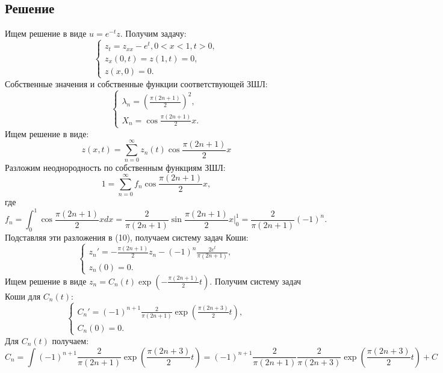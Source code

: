 \documentclass[11pt]{article}
\begin{document}
\subsection{Решение}
\label{sec:orgbe3dfe1}
Ищем решение в виде $u = e^{-t}z$. Получим задачу:
\begin{equation}
\begin{cases}
z_t = z_{xx} - e^t, 0 < x < 1, t > 0, \\
z_x(0, t) = z(1, t) = 0, \\
z(x, 0) = 0.
\end{cases}
\end{equation}
Собственные значения и собственные функции соответствующей ЗШЛ:
\begin{equation*}
\begin{cases}
\lambda_n = \left(\frac{\pi(2n + 1)}2\right)^2, \\
X_n = \cos\frac{\pi(2n + 1)}2x.
\end{cases}
\end{equation*}
Ищем решение в виде:
\begin{equation}
z(x, t) = \sum_{n = 0}^{\infty}z_n(t)\cos\frac{\pi(2n + 1)}2x
\end{equation}
Разложим неоднородность по собственным функциям ЗШЛ:
\begin{equation*}
1 = \sum_{n = 0}^{\infty}f_n\cos\frac{\pi(2n + 1)}2x,
\end{equation*}
где
\begin{equation*}
f_n = \int_0^1\cos\frac{\pi(2n + 1)}2xdx = \frac2{\pi(2n + 1)}\sin\frac{\pi(2n + 1)}2x|_0^1 = 
\frac2{\pi(2n + 1)}(-1)^n.
\end{equation*}
Подставляя эти разложения в (10), получаем систему задач Коши:
\begin{equation}
\begin{cases}
z_n' = -\frac{\pi(2n + 1)}2z_n - (-1)^n\frac{2e^t}{\pi(2n + 1)}, \\
z_n(0) = 0.
\end{cases}
\end{equation}
Ищем решение в виде $z_n = C_n(t)\exp\left(-\frac{\pi(2n + 1)}2t\right)$. Получим систему задач
Коши для $C_n(t)$:
\begin{equation}
\begin{cases}
C_n' = (-1)^{n + 1}\frac2{\pi(2n + 1)}\exp\left(\frac{\pi(2n + 3)}2t\right), \\
C_n(0) = 0.
\end{cases}
\end{equation}
Для $C_n(t)$ получаем:
\begin{equation*}
C_n = \int (-1)^{n + 1}\frac2{\pi(2n + 1)}\exp\left(\frac{\pi(2n + 3)}2t\right) = 
(-1)^{n + 1}\frac2{\pi(2n + 1)}\frac2{\pi(2n + 3)}\exp\left(\frac{\pi(2n + 3)}2t\right) + C
\end{equation*}
\end{document}
